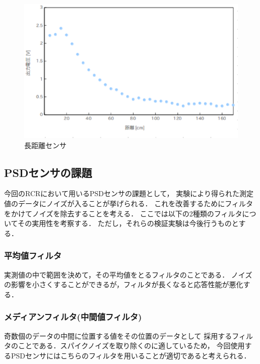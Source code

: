 \documentclass[10pt,a4j]{jarticle}
\begin{document}
\begin{figure}[h]
  \begin{center}
    \includegraphics[width=1.0\hsize]{picture/psdf.eps}
    \caption{長距離センサ}
    \label{psdf}
  \end{center}
\end{figure}


\newpage
\subsection{PSDセンサの課題}
今回のRCRにおいて用いるPSDセンサの課題として，
実験により得られた測定値のデータにノイズが入ることが挙げられる．
これを改善するためにフィルタをかけてノイズを除去することを考える．
ここでは以下の2種類のフィルタについてその実用性を考察する．
ただし，それらの検証実験は今後行うものとする．

\subsubsection{平均値フィルタ}
実測値の中で範囲を決めて，その平均値をとるフィルタのことである．
ノイズの影響を小さくすることができるが，フィルタが長くなると応答性能が悪化する．

\subsubsection{メディアンフィルタ(中間値フィルタ)}
奇数個のデータの中間に位置する値をその位置のデータとして
採用するフィルタのことである．スパイクノイズを取り除くのに適しているため，
今回使用するPSDセンサにはこちらのフィルタを用いることが適切であると考えられる．





\end{document}
